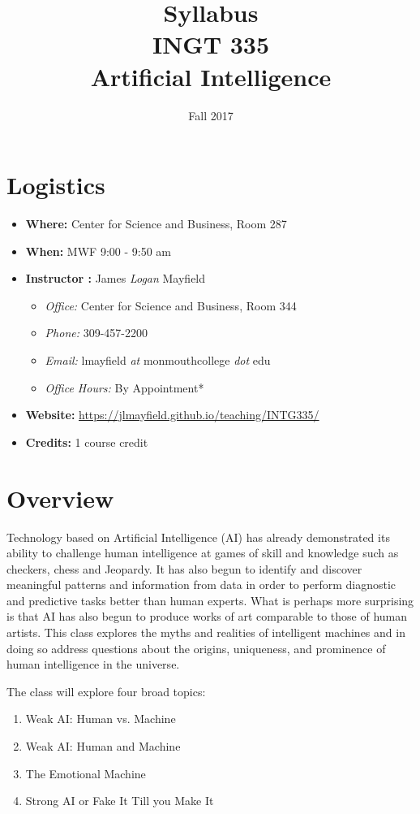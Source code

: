 \documentclass[nobib]{tufte-handout}
\title{Syllabus \\ INGT 335 \\ Artificial Intelligence}
\author{}
\date{ Fall 2017 }
\begin{document}
\maketitle

\section{Logistics}
\begin{itemize}
\item \textbf{Where: } Center for Science and Business, Room 287
\item \textbf{When: } MWF 9:00 - 9:50 am
\item \textbf{Instructor :} James \textit{Logan} Mayfield
\begin{itemize}
\item \textit{Office: } Center for Science and Business, Room 344
\item \textit{Phone: } 309-457-2200
\item \textit{Email: } lmayfield \textit{at} monmouthcollege \textit{dot} edu
\item \textit{Office Hours: } By Appointment*
\end{itemize}
\item \textbf{Website: } \url{https://jlmayfield.github.io/teaching/INTG335/}
\item \textbf{Credits: } 1 course credit
\end{itemize}

\section{Overview}

Technology based on Artificial Intelligence (AI) has already demonstrated its ability to challenge human intelligence at games of skill and knowledge such as checkers, chess and Jeopardy. It has also begun to identify and discover meaningful patterns and information from data in order to perform diagnostic and predictive tasks better than human experts.  What is perhaps more surprising is that AI has also begun to produce works of art comparable to those of human artists. This class explores the myths and realities of intelligent machines and in doing so address questions about the origins, uniqueness, and prominence of human intelligence in the universe.

The class will explore four broad topics:
\begin{enumerate}
\item Weak AI: Human vs. Machine
\item Weak AI: Human and Machine
\item The Emotional Machine
\item Strong AI or Fake It Till you Make It
\end{enumerate}
\end{document}

